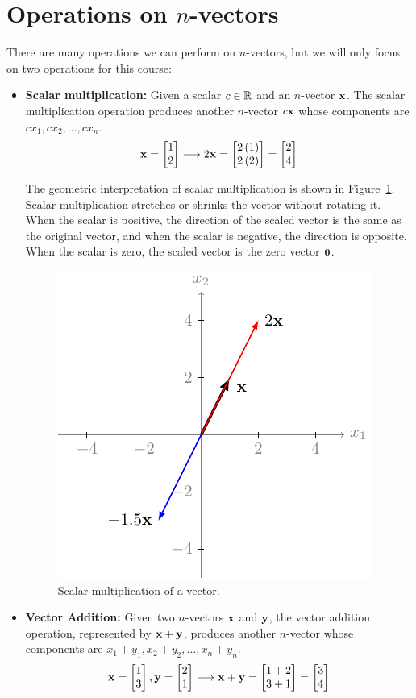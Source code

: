 \section{Operations on $n$-vectors}
There are many operations we can perform on $n$-vectors, but we will only focus on two operations for this course:
\begin{itemize}
    \item \textbf{Scalar multiplication:} Given a scalar $c \in \mathbb{R}$ and an $n$-vector $\mathbf{x}$. The scalar multiplication operation produces another $n$-vector $c\mathbf{x}$ whose components are $cx_1, cx_2, \ldots, cx_n$. 
    \[ \mf{x} = \bmx 1 \\ 2\emx \longrightarrow 2 \mf{x} = \bmx  2\ct{1} \\ 2\ct{2} \emx = \bmx  2 \\ 4 \emx \]

    The geometric interpretation of scalar multiplication is shown in Figure~\ref{fig:ch01-scalar-mult}. Scalar multiplication stretches or shrinks the vector without rotating it. When the scalar is positive, the direction of the scaled vector is the same as the original vector, and when the scalar is negative, the direction is opposite. When the scalar is zero, the scaled vector is the zero vector $\mathbf{0}$. 
    \begin{figure}[h!]
        \centering
        \includegraphics{figure/chapter01/vec-scale.pdf}
        \caption{Scalar multiplication of a vector.}
        \label{fig:ch01-scalar-mult}
    \end{figure}
    
    \item \textbf{Vector Addition:} Given two $n$-vectors $\mathbf{x}$ and $\mathbf{y}$, the vector addition operation, represented by $\mathbf{x} + \mathbf{y}$, produces another $n$-vector whose components are $x_1 + y_1, x_2 + y_2, \ldots, x_n + y_n$.
    \[ \mf{x} = \bmxc 1 \\ 3 \emx, \mf{y} = \bmxc 2 \\ 1 \emx \longrightarrow \mf{x} + \mf{y} = \bmxc 1 + 2 \\ 3 + 1 \emx = \bmxc 3 \\ 4 \emx \]
    

\end{itemize}

